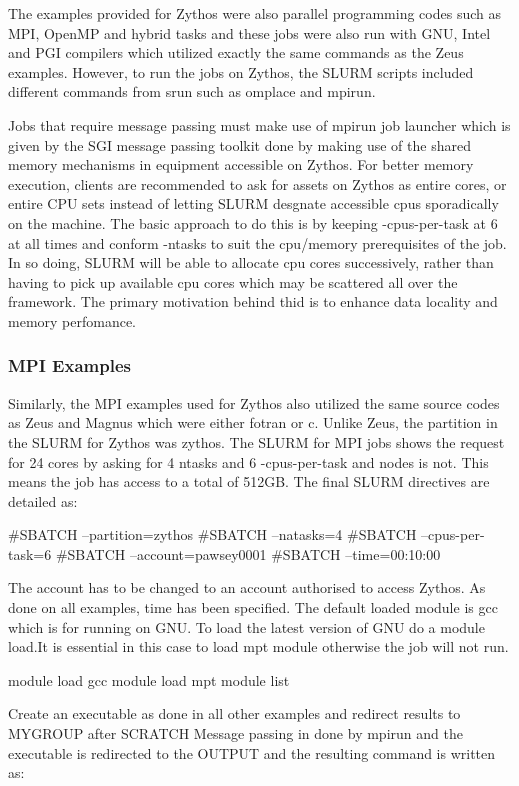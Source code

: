 \documentclass[journal]{IEEEtran}
\begin{document}
The examples provided for Zythos were also parallel programming codes such as MPI, OpenMP and hybrid tasks and these jobs were also run with GNU, Intel
and PGI compilers which utilized exactly the same commands as the Zeus examples. However, to run the jobs on Zythos, the SLURM scripts included
different commands from srun such as omplace and mpirun. 



Jobs that require message passing must make use of mpirun job launcher which is given by the SGI message passing toolkit done by making use of the 
shared memory mechanisms in equipment accessible on Zythos.
For better memory execution, clients are recommended to ask for assets on Zythos as entire cores, or entire CPU sets instead of letting SLURM 
desgnate accessible cpus sporadically on the machine. 
The basic approach to do this is by keeping -cpus-per-task at 6 at all times and conform -ntasks to suit the cpu/memory prerequisites of the job.
In so doing, SLURM will be able to allocate cpu cores successively, rather than having to pick up available cpu cores which may be scattered all 
over the framework.
The primary motivation behind thid is to enhance data locality and memory perfomance.

\subsubsection{MPI Examples}

Similarly, the MPI examples used for Zythos also utilized the same source codes as Zeus and Magnus which were either fotran or c. Unlike Zeus, the
partition in the SLURM for Zythos was zythos. 
The SLURM for MPI jobs shows the request for 24 cores by asking for 4 ntasks and 6 -cpus-per-task and nodes is not. 
This means the job has access to a total of 512GB.
The final SLURM directives are detailed as:

#SBATCH --partition=zythos
#SBATCH --natasks=4
#SBATCH --cpus-per-task=6
#SBATCH --account=pawsey0001
#SBATCH --time=00:10:00

The account has to be changed to an account authorised to access Zythos.
As done on all examples, time has been specified.
The default loaded module is gcc which is for running on GNU.
To load the latest version of GNU do a module load.It is essential in this case to load mpt module otherwise the job will not run.

module load gcc
module load mpt
module list

Create an executable as done in all other examples and redirect results to MYGROUP after SCRATCH
Message passing in done by mpirun and the executable is redirected to the OUTPUT and the resulting command is written as:
\end{document}
